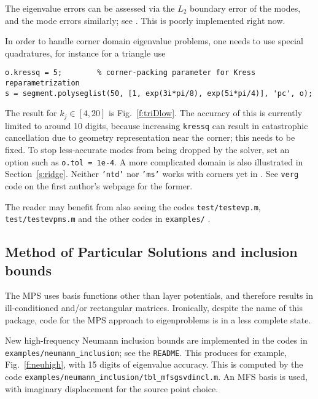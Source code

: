 The eigenvalue errors can be assessed via the $L_2$ boundary error of the
modes, and the mode errors similarly; see \cite{sca}.
This is poorly implemented right now.

In order to handle corner domain eigenvalue problems, one needs to
use special quadratures,
for instance for a triangle use
\begin{verbatim}
o.kressq = 5;        % corner-packing parameter for Kress reparametrization
s = segment.polyseglist(50, [1, exp(3i*pi/8), exp(5i*pi/4)], 'pc', o);
\end{verbatim}
The result for $k_j \in [4,20]$ is Fig.~\ref{f:triDlow}.
The accuracy of this is currently limited to around 10 digits,
because increasing {\tt kressq}
can result in catastrophic cancellation due to geometry representation
near the corner; this needs to be fixed.
To stop less-accurate modes from being dropped by the solver,
set an option such as
{\tt o.tol = 1e-4}.
A more complicated domain is also illustrated in Section~\ref{s:ridge}.
Neither {\tt 'ntd'} nor {\tt 'ms'} works with corners yet in \mpspack.
See {\tt verg} code on the first author's webpage for the former.

The reader may benefit from also seeing the
codes {\tt test/testevp.m}, {\tt test/testevpms.m}
and the other codes in {\tt examples/} .





\bfi %
\efi

\subsection{Method of Particular Solutions and inclusion bounds}

The MPS \cite{mps}
uses basis functions other than layer potentials, and therefore
results in ill-conditioned and/or rectangular matrices.
Ironically, despite the name of this package,
code for the MPS approach to eigenproblems is in a less complete state.

New high-frequency Neumann inclusion bounds
\cite{ninc}
are implemented in the codes in \verb+examples/neumann_inclusion+;
see the {\tt README}. This produces for example, Fig.~\ref{f:neuhigh},
with 15 digits of eigenvalue accuracy.
This is computed by the code \verb+examples/neumann_inclusion/tbl_mfsgsvdincl.m+.
An MFS basis is used, with imaginary displacement for the source point choice.

